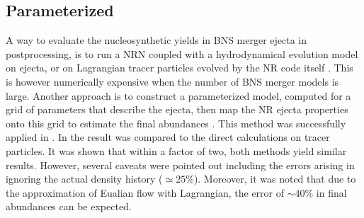 \subsection{Parameterized \nuc{}}
A way to evaluate the nucleosynthetic yields in \ac{BNS} merger ejecta 
in postprocessing, is to run a \ac{NRN} coupled with a hydrodynamical 
evolution model on ejecta, or on Lagrangian tracer particles 
evolved by the \ac{NR} code itself 
\citep[\eg][]{Goriely:2011vg,Korobkin:2012uy,Grossman:2013lqa,Wanajo:2014wha,Just:2014fka,Martin:2015hxa}.
This is however numerically expensive when the number of \ac{BNS} 
merger models is large. 
%
Another approach is to construct a parameterized \nuc{} model, 
computed for a grid of parameters that describe the ejecta, 
then map the \ac{NR} ejecta properties onto this grid to estimate the 
final abundances \citep{Lippuner:2015gwa}. 
%
This method was successfully applied in \citet{Radice:2016dwd,Radice:2018pdn}.
In \citet{Radice:2018pdn} the result was compared to the direct \nuc{} 
calculations on tracer particles. 
It was shown that within a factor of two, both methods yield similar results. 
However, several caveats were pointed out including the errors arising in 
ignoring the actual density history (${\simeq}25\%$). Moreover, it was 
noted that due to the approximation of Eualian flow with Lagrangian, 
the error of ${\sim}40\%$ in final abundances can be expected.

